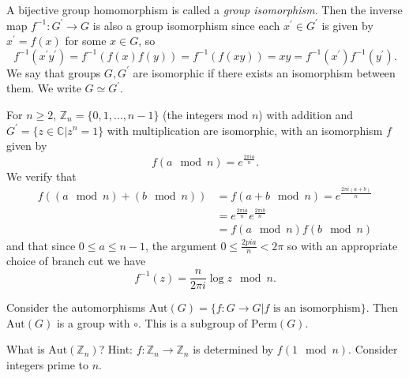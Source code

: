 \begin{defn}
A bijective group homomorphism is called a \emph{group isomorphism}.
Then the inverse map $f^{-1} : G^\prime \to G$ is also a group
isomorphism since each $x^\prime \in G^\prime$ is given by $x^\prime = f(x)$
for some $x \in G$, so
$$
f^{-1}(x^\prime y^\prime) = f^{-1}(f(x)f(y))
                      = f^{-1}(f(xy))
                      = x y
                      = f^{-1}(x^\prime) f^{-1}(y^\prime).
$$
We say that groups $G, G^\prime$ are isomorphic if there exists an isomorphism
between them. We write $G \simeq G^\prime$.
\end{defn}
\begin{xmpl}
For $n \geq 2$, $\mathbb{Z}_n = \{ 0, 1, \dots, n-1 \}$ (the integers mod $n$)
with addition
and $G^\prime = \{ z \in \mathbb{C} | z^n = 1 \}$ with multiplication
are isomorphic, with an isomorphism $f$ given by
$$
f(a \mod n) = e^{\frac{2 \pi i a}{n}}.
$$
We verify that
\begin{align*}
f((a \mod n) + (b \mod n))
 &= f(a + b \mod n)
  = e^{\frac{2 \pi i (a + b)}{n}} \\
 &= e^{\frac{2 \pi i a}{n}} e^{\frac{2 \pi i b}{n}} \\
 &= f(a \mod n) f(b \mod n)
\end{align*}
and that since $0 \leq a \leq n-1$, the argument
$0 \leq \frac{2 pi a}{n} < 2\pi$ so
with an appropriate choice of branch cut we have
$$
f^{-1}(z) = \frac{n}{2 \pi i} \log z \mod n.
$$
\end{xmpl}

Consider the automorphisms
$\mathrm{Aut}(G) = \{f : G \to G | f \text{ is an isomorphism}\}$.
Then $\mathrm{Aut}(G)$ is a group with $\circ$. This is a subgroup
of $\mathrm{Perm}(G)$.

\begin{Problem}
What is $\mathrm{Aut}(\mathbb{Z}_n)$?
Hint: $f : \mathbb{Z}_n \to \mathbb{Z}_n$ is determined by $f(1 \mod n)$.
Consider integers prime to $n$.
\end{Problem}

